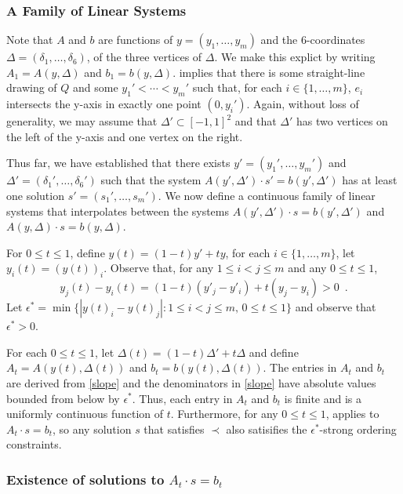 \documentclass{patmorin}
\begin{document}
\subsubsection{A Family of Linear Systems}

   Note that $A$ and $b$ are functions of $y=(y_1,\ldots,y_m)$
   and the 6-coordinates $\Delta=(\delta_1,\ldots,\delta_6)$, of
   the three vertices of $\Delta$.  We make this explict by writing
   $A_1=A(y,\Delta)$ and $b_1=b(y,\Delta)$.  
   implies that there is some straight-line drawing of $Q$ and some
   $y_1'<\cdots< y_m'$ such that, for each $i\in\{1,\ldots,m\}$, $e_i$
   intersects the y-axis in exactly one point $(0,y_i')$.  Again, without loss
   of generality, we may assume that $\Delta'\subset [-1,1]^2$ and that
   $\Delta'$ has two vertices on the left of the y-axis and one vertex
   on the right.

   Thus far, we have established that there exists $y'=(y_1',\ldots,y_m')$
   and $\Delta'=(\delta_1',\ldots,\delta_6')$ such that the
   system $A(y',\Delta')\cdot s' = b(y',\Delta')$ has at least one
   solution $s'=(s_1',\ldots,s_m')$.  We now define a continuous
   family of linear systems that interpolates between the systems
   $A(y',\Delta')\cdot s=b(y',\Delta')$ and $A(y,\Delta)\cdot s=b(y,\Delta)$.

   For $0\le t\le 1$, define $y(t) = (1-t)y' + ty$, for each
   $i\in\{1,\ldots,m\}$, let $y_i(t)=(y(t))_i$.  Observe that, for any
   $1\le i< j\le m$ and any $0\le t\le 1$,
   \[
       y_j(t) - y_i(t) = (1-t)(y'_j-y'_i) + t(y_j-y_i) > 0 \enspace .
   \]
   Let $\epsilon^*=\min\{|y(t)_i-y(t)_j| : 1\le i< j\le m,\, 0\le t\le 1\}$
   and observe that $\epsilon^* >0$.

   For each $0\le t\le 1$, let $\Delta(t)=(1-t)\Delta' + t\Delta$ and define
   $A_t=A(y(t),\Delta(t))$ and $b_t=b(y(t),\Delta(t))$.  The entries in
   $A_t$ and $b_t$ are derived from \eqref{slope} and the denominators in
   \eqref{slope} have absolute values bounded from below by $\epsilon^*$.
   Thus, each entry in $A_t$ and $b_t$ is finite and is a uniformly
   continuous function of $t$.  Furthermore, for any $0\le t\le 1$,
    applies to $A_t\cdot s =b_t$, so any solution
   $s$ that satisfies $\prec$ also satisifies the $\epsilon^*$-strong
   ordering constraints.

\subsubsection{Existence of solutions to $A_t\cdot s=b_t$}
\end{document}

